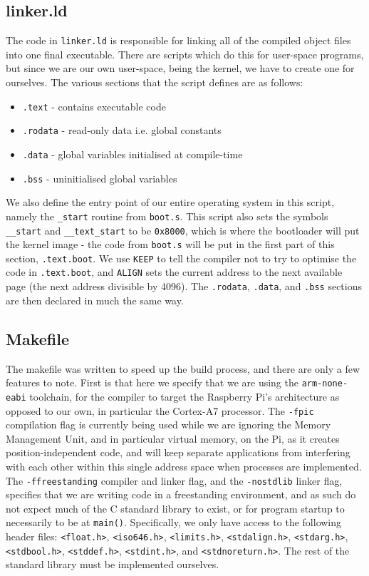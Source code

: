 \documentclass[10pt,a4paper]{article}
\newcommand{\code}[1]{\texttt{#1}}
\begin{document}
\subsection{linker.ld}
The code in \code{linker.ld} is responsible for linking all of the compiled
object files into one final executable. There are scripts which do this for
user-space programs, but since we are our own user-space, being the kernel, we
have to create one for ourselves. The various sections that the script defines
are as follows:
\begin{itemize}
    \itemsep0em
    \item \code{.text} - contains executable code
    \item \code{.rodata} - read-only data i.e. global constants
    \item \code{.data} - global variables initialised at compile-time
    \item \code{.bss} - uninitialised global variables
\end{itemize}

We also define the entry point of our entire operating system in this script,
namely the \code{\_start} routine from \code{boot.s}. This script also sets the
symbols \code{\_\_start} and \code{\_\_text\_start} to be \code{0x8000}, which
is where the bootloader will put the kernel image - the code from \code{boot.s}
will be put in the first part of this section, \code{.text.boot}. We use
\code{KEEP} to tell the compiler not to try to optimise the code in
\code{.text.boot}, and \code{ALIGN} sets the current address to the next
available page (the next address divisible by 4096). The \code{.rodata},
\code{.data}, and \code{.bss} sections are then declared in much the same way.

\subsection{Makefile}
The makefile was written to speed up the build process, and there are only a few
features to note. First is that here we specify that we are using the
\code{arm-none-eabi} toolchain, for the compiler to target the Raspberry Pi's
architecture as opposed to our own, in particular the Cortex-A7 processor. The
\code{-fpic} compilation flag is currently being used while we are ignoring the
Memory Management Unit, and in particular virtual memory, on the Pi, as it
creates position-independent code, and will keep separate applications from
interfering with each other within this single address space when processes are
implemented. The \code{-ffreestanding} compiler and linker flag, and the
\code{-nostdlib} linker flag, specifies that we are writing code in a
freestanding environment, and as such do not expect much of the C standard
library to exist, or for program startup to necessarily to be at \code{main()}.
Specifically, we only have access to the following header files:
\code{<float.h>}, \code{<iso646.h>}, \code{<limits.h>}, \code{<stdalign.h>},
\code{<stdarg.h>}, \code{<stdbool.h>}, \code{<stddef.h>}, \code{<stdint.h>}, and
\code{<stdnoreturn.h>}. The rest of the standard library must be implemented
ourselves.
\end{document}
